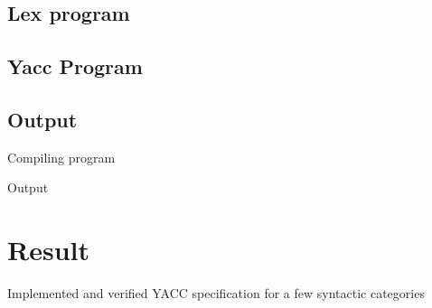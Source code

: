 \subsection{Lex program}

\subsection{Yacc Program}

\subsection{Output}
Compiling program



\vspace{0.5cm}
Output



\section{Result}
Implemented and verified YACC specification for a few syntactic categories